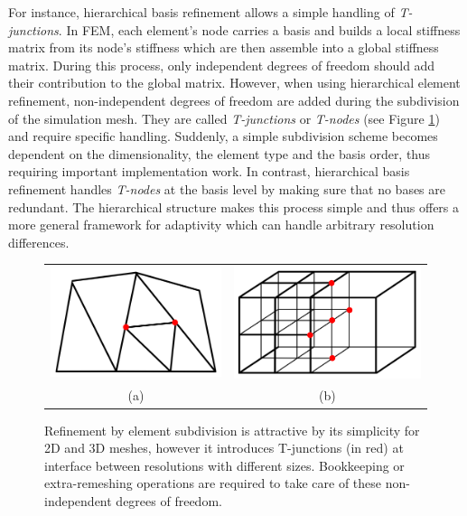 For instance, hierarchical basis refinement allows a simple handling of \emph{T-junctions}.
In FEM, each element's node carries a basis and builds a local stiffness matrix from its node's stiffness which are then assemble into a global stiffness matrix.
During this process, only independent degrees of freedom should add their contribution to the global matrix. However, when using hierarchical element refinement, non-independent degrees of freedom are added during the subdivision of the simulation mesh. They are called \emph{T-junctions} or \emph{T-nodes} (see Figure \ref{fig:tjunctions}) and require specific handling. Suddenly, a simple subdivision scheme becomes dependent on the dimensionality, the element type and the basis order, thus requiring important implementation work. In contrast, hierarchical basis refinement handles \emph{T-nodes} at the basis level by making sure that no bases are redundant. The hierarchical structure makes this process simple and thus offers a more general framework for adaptivity which can handle arbitrary resolution differences.
\begin{figure}[!h]
	\centering
	\begin{tabular}{cc}
		\includegraphics[width=0.35\linewidth]{images/starAdaptivity-cgf2016/tjunction-triangle.png} &
		\includegraphics[width=0.35\linewidth]{images/starAdaptivity-cgf2016/tjunction-grid.png} \\
		(a) & (b)
	\end{tabular}
	\caption[STAR adaptivity: T-junction]{\label{fig:tjunctions} Refinement by element subdivision is attractive by its simplicity for 2D and 3D meshes, however it introduces T-junctions (in red) at interface between resolutions with different sizes. Bookkeeping or extra-remeshing operations are required to take care of these non-independent degrees of freedom.}
\end{figure}

